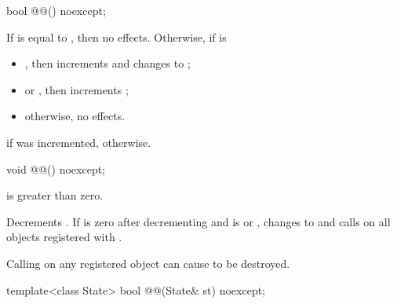 %
\begin{itemdecl}
bool @@() noexcept;
\end{itemdecl}

\begin{itemdescr}
\pnum
\effects
If  is equal to , then no effects.
Otherwise, if  is
\begin{itemize}
\item
{},
then increments  and changes  to ;
\item
{} or ,
then increments ;
\item
otherwise, no effects.
\end{itemize}

\pnum
\returns
{} if  was incremented,  otherwise.
\end{itemdescr}

%
\begin{itemdecl}
void @@() noexcept;
\end{itemdecl}

\begin{itemdescr}
\pnum
\expects
{} is greater than zero.

\pnum
\effects
Decrements .
If  is zero after decrementing and
 is  or ,
changes  to  and
calls  on all objects registered with .
\begin{note}
Calling  on any registered object
can cause  to be destroyed.
\end{note}
\end{itemdescr}

%
\begin{itemdecl}
template<class State>
  bool @@(State& st) noexcept;
\end{itemdecl}

